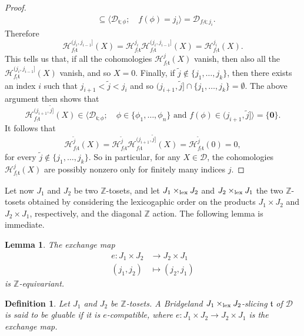 \documentclass{article}
\newtheorem{lem}[thm]{Lemma}
\newtheorem{defn}[thm]{Definition}
\theoremstyle{definition}
\newcommand{\Z}{\mathbb{Z}}
\newcommand{\tee}{\mathfrak{t}}
\newcommand{\lex}{\times_{\textnormal{lex}}}
\begin{document}
\begin{proof}
\begin{align*}
&\subseteq \langle \mathscr{D}_{\tee;\phi};\quad  f(\phi)=j_{i}\rangle=\mathscr{D}_{f_!\tee;j_{i}}.
\end{align*}
Therefore
\[
\mathcal{H}^{(j_i,j_{i-1}]}_{f_!\tee}(X)=\mathcal{H}^{j_i}_{f_!\tee}\mathcal{H}^{(j_i,j_{i-1}]}_{f_!\tee}(X)=\mathcal{H}^{j_i}_{f_!\tee}(X).
\]
This tells us that, if all the cohomologies $\mathcal{H}^{j}_{f_!\tee}(X)$ vanish, then also all the $\mathcal{H}^{(j_i,j_{i-1}]}_{f_!\tee}(X)$ vanish, and so $X=0$. Finally, if $\tilde{j}\notin\{j_1,\dots,j_k\}$, then there exists an index $i$ such that $j_{i+1}<\tilde{j}<j_{i}$ and so $(j_{i+1},\tilde{j}]\cap \{j_1,\dots,j_k\}=\emptyset$. The above argument then shows that
\[
\mathcal{H}^{(j_{i+1},\tilde{j}]}_{f_!\tee}(X)\in\langle \mathscr{D}_{\tee;\phi};\quad \phi\in\{\phi_1,\dots,\phi_n\}\text{ and } f(\phi)\in(j_{i+1},\tilde{j}]\rangle=\{\mathbf{0}\}.
\]
It follows that 
\[
\mathcal{H}^{\tilde{j}}_{f_!\tee}(X)=\mathcal{H}^{\tilde{j}}_{f_!\tee}\mathcal{H}^{(j_{i+1},\tilde{j}]}_{f_!\tee}(X)=\mathcal{H}^{\tilde{j}}_{f_!\tee}(0)=0,
\]
for every $\tilde{j}\notin \{j_1,\dots,j_k\}$. So in particular, for any $X\in \mathscr{D}$, the cohomologies $\mathcal{H}^{j}_{f_!\tee}(X)$ are possibly nonzero only for finitely many indices $j$. 
\end{proof}


Let now $J_1$ and $J_2$ be two $\mathbb{Z}$-tosets, and let $J_1 \lex J_2$ and $J_2 \lex J_1$ the two $\Z$-tosets obtained by considering the lexicogaphic order on the products $J_1\times J_2$ and $J_2\times J_1$, respectively, and the diagonal $\Z$ action. The following lemma is immediate.
\begin{lem}
The exchange map
\begin{align*}
e\colon J_1\times J_2&\to J_2\times J_1\\
(j_1,j_2)&\mapsto (j_2,j_1)
\end{align*}
is $\Z$-equivariant.
\end{lem}

\begin{defn}
Let $J_1$ and $J_2$ be $\Z$-tosets. A Bridgeland $J_1 \lex J_2$-slicing $\tee$ of $\mathscr{D}$ is said to be \emph{gluable} if it is $e$-compatible, where $e \colon J_1 \times J_2 \to J_2 \times J_1$ is the exchange map. 
\end{defn}
\end{document}
